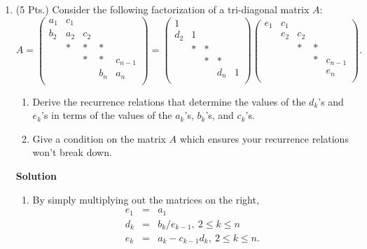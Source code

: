 \documentclass{article}
\begin{document}
\begin{enumerate}
\item (5 Pts.) Consider the following factorization of a tri-diagonal matrix \(A\):
\[A = \left( \begin{array}{*{5}{c}}
             a_1 & c_1 \\
             b_2 & a_2 & c_2 \\
             & * & * & * \\
             & & * & * & c_{n-1} \\
             & & & b_n & a_n \\
             \end{array} \right)
    = \left( \begin{array}{*{5}{c}}
             1 \\
             d_2 & 1 \\
             & * & * \\
             & & * & * \\
             & & & d_n & 1 \\
             \end{array} \right)
      \left( \begin{array}{*{5}{c}}
             e_1 & c_1 \\
             & e_2 & c_2 \\
             & & * & * \\
             & & & * & c_{n-1} \\
             & & & & e_n \\
             \end{array}
      \right).\]

\begin{enumerate}
\item Derive the recurrence relations that determine the values of the \(d_k\)'s and \(e_k\)'s in terms of the values of the \(a_k\)'s, \(b_k\)'s, and \(c_k\)'s.

\item Give a condition on the matrix \(A\) which ensures your recurrence relations won't break down.

\end{enumerate}

{\bf Solution}

\begin{enumerate}
\item By simply multiplying out the matrices on the right,
\begin{eqnarray*}
e_1 & = & a_1 \\
d_k & = & b_k / e_{k - 1}, \ 2 \leq k \leq n \\
e_k & = & a_k - c_{k - 1} d_k, \ 2 \leq k \leq n.
\end{eqnarray*}


\end{enumerate}
\end{enumerate}
\end{document}
